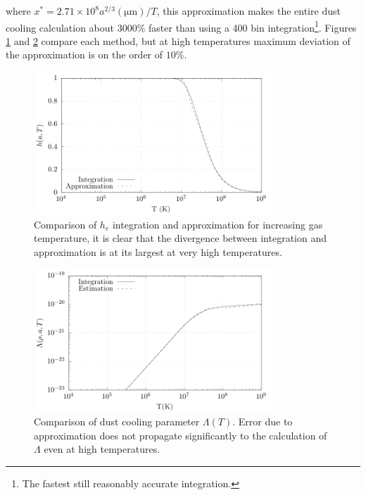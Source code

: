 where $x^* = 2.71\times 10^8 a^{2/3} (\si{\micro\metre})/T$, this approximation makes the entire dust cooling calculation about 3000\% faster than using a 400 bin integration\footnote{The fastest still reasonably accurate integration.}. Figures \ref{fig:hecomparison} and \ref{fig:lambdacomparison} compare each method, but at high temperatures maximum deviation of the approximation is on the order of $10\%$.

\begin{figure}[t]
  \centering
  \includegraphics[width=0.8\textwidth]{assets/xe/temp.pdf}
  \caption[Comparison of $h_e$ integration and approximation for increasing gas temperature]{Comparison of $h_e$ integration and approximation for increasing gas temperature, it is clear that the divergence between integration and approximation is at its largest at very high temperatures.}
  \label{fig:hecomparison}
\end{figure}

\begin{figure}[ht]
  \centering
  \includegraphics[width=0.8\textwidth]{assets/dustcooling/lambda-comp.pdf}
  \caption[Comparison of dust cooling parameter $\Lambda$(T)]{Comparison of dust cooling parameter $\Lambda(T)$. Error due to approximation does not propagate significantly to the calculation of $\Lambda$ even at high temperatures.}
  \label{fig:lambdacomparison}
\end{figure}


